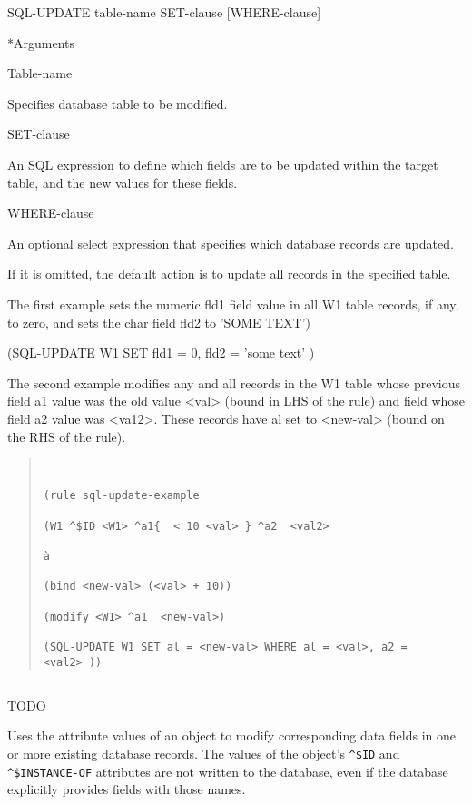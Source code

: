 {{\Format

SQL-UPDATE table-name SET-clause [WHERE-clause]



*Arguments

Table-name

Specifies database table to be modified.

SET-clause

An SQL expression to define which fields are to be updated
within the target table, and the new values for these fields.

WHERE-clause

An optional select expression that specifies which database
records are updated.

If it is omitted, the default action is to update all records
in the specified table.



\Example

The first example sets the numeric fld1 field value in all W1
table records, if any, to zero, and sets the char field fld2
to 'SOME TEXT')



(SQL-UPDATE W1 SET fld1 = 0, fld2 = 'some text' )



The second example modifies any and all records in the W1
table whose previous field a1 value was the old value <val>
(bound in LHS of the rule) and field whose field a2 value was
<va12>. These records have al set to <new-val> (bound on the
RHS of the rule).
\begin{quote}
\begin{verbatim}


(rule sql-update-example

(W1 ^$ID <W1> ^a1{  < 10 <val> } ^a2  <val2>

à

(bind <new-val> (<val> + 10))

(modify <W1> ^a1  <new-val>)

(SQL-UPDATE W1 SET al = <new-val> WHERE al = <val>, a2 =
<val2> ))
\end{verbatim}
\end{quote}

\subsection{}
TODO

Uses the attribute values of an object to modify corresponding data
fields in one or more existing database records. The values of the
object's \verb|^$ID| and \verb|^$INSTANCE-OF| attributes are not
written to the database, even if the database explicitly provides
fields with those names.

}}
